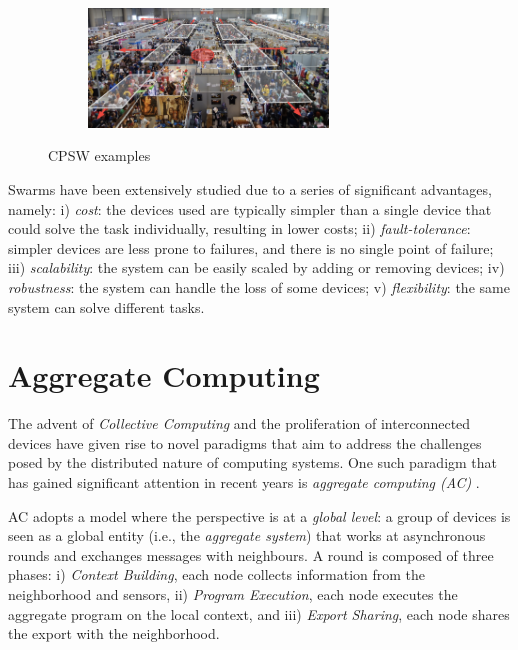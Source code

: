 \documentclass[12pt,a4paper,openright,twoside]{book}
\begin{document}
\begin{figure}[t]
\begin{subfigure}[b]{0.49\textwidth}
        \centering
        \includegraphics[width=0.7\textwidth]{figures/crowd.png}
    \end{subfigure}
    \caption{CPSW examples}%
    \label{fig:cpsw}
\end{figure}


Swarms have been extensively studied due to a series of significant advantages, namely:
    i) \emph{cost}: the devices used are typically simpler than a single device that could solve the task individually, resulting in lower costs;
    ii) \emph{fault-tolerance}: simpler devices are less prone to failures, and there is no single point of failure;
    iii) \emph{scalability}: the system can be easily scaled by adding or removing devices;
    iv) \emph{robustness}: the system can handle the loss of some devices;
    v) \emph{flexibility}: the same system can solve different tasks.




%
\section{Aggregate Computing}

The advent of \emph{Collective Computing} and the proliferation of interconnected devices have given rise to novel 
    paradigms that aim to address the challenges posed by the distributed nature of computing
    systems. One such paradigm that has gained significant attention in recent years is 
    \emph{aggregate computing (AC)} \cite{AC}.

AC adopts a model where the perspective is at a \emph{global level}: 
    a group of devices is seen as a global entity (i.e., the \emph{aggregate system}) that works at asynchronous 
    rounds and exchanges messages with neighbours. 
    A round is composed of three phases:
    i) \emph{Context Building}, each node collects information from the 
        neighborhood and sensors,
    ii) \emph{Program Execution}, each node executes the aggregate program on the local context, and
    iii) \emph{Export Sharing}, each node shares the export with the neighborhood.
\end{document}
